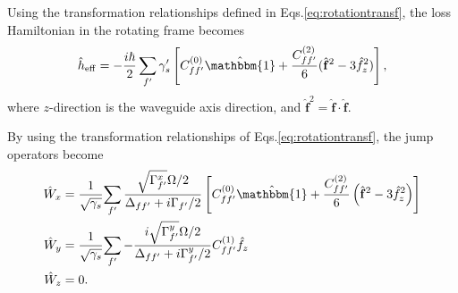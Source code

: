 \documentclass[preprint,aps,pra,onecolumn,superscriptaddress]{revtex4-1} %
\begin{document}
\begin{appendix}
Using the transformation relationships defined in Eqs.\eqref{eq:rotationtransf}, the loss Hamiltonian in the rotating frame becomes
\begin{subequations}\label{eq:rotationtransf_hloss}
\begin{align}
\hat{h}_{\rm eff} =-\frac{i\hbar}{2} \sum_{f'}\gamma'_s \left[C_{ff'}^{(0)}\hat{\mathbbm{1}} + \frac{C_{ff'}^{(2)}}{6}(\hat{\mathbf{f}}^2-3\hat{f}_z^2 ) \right],
\end{align}
\end{subequations}
where $ z $-direction is the waveguide axis direction, and $ \hat{\mathbf{f}}^2=\hat{\mathbf{f}}\cdot\hat{\mathbf{f}} $.


By using the transformation relationships of Eqs.\eqref{eq:rotationtransf}, the jump operators become 
\begin{subequations}\label{eq:rotationtransf_Wxyz}
\begin{align}
\hat{W}_{x} &= \frac{1}{\sqrt{\gamma_s}}\!\sum_{f'} \frac{\sqrt{\Gamma_{f'}^x}\Omega/2}{\Delta_{ff'}+i\Gamma_{f'}/2} \left[C_{ff'}^{(0)}\hat{\mathbbm{1}} + \frac{C_{ff'}^{(2)}}{6}\left(\hat{\mathbf{f}}^2-3\hat{f}_{z}^2 \right) \right]\\
\hat{W}_{y} &= \frac{1}{\sqrt{\gamma_s}}\!\sum_{f'} -\frac{i\sqrt{\Gamma_{f'}^y}\Omega/2}{\Delta_{ff'}+i\Gamma_{f'}^y/2} C_{ff'}^{(1)}\hat{f}_z  \\
\hat{W}_{z} &= 0.
\end{align}
\end{subequations}


\end{appendix}
\end{document}

